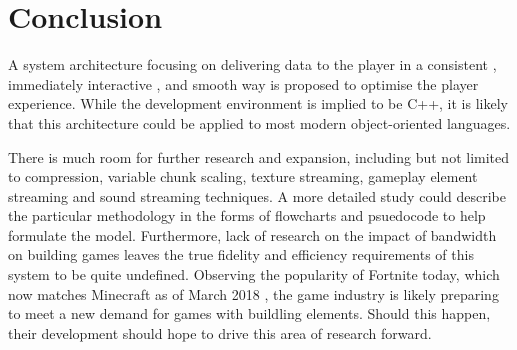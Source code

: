 \documentclass{scrartcl}
\begin{document}
\section{Conclusion}
A system architecture focusing on delivering data to the player in a consistent \cite{qoelargestudy} \cite{lagragequits}, immediately interactive \cite{motivation}, and smooth \cite{graphicsvsexperience} \cite{lagragequits} way is proposed to optimise the player experience. While the development environment is implied to be C++, it is likely that this architecture could be applied to most modern object-oriented languages.

There is much room for further research and expansion, including but not limited to compression, variable chunk scaling, texture streaming, gameplay element streaming and sound streaming techniques. A more detailed study could describe the particular methodology in the forms of flowcharts and psuedocode to help formulate the model. Furthermore, lack of research on the impact of bandwidth on building games leaves the true fidelity and efficiency requirements of this system to be quite undefined. Observing the popularity of Fortnite today, which now matches Minecraft as of March 2018 \cite{minecraftnite}, the game industry is likely preparing to meet a new demand for games with buildling elements. Should this happen, their development should hope to drive this area of research forward.

 

\end{document}
